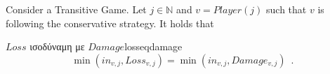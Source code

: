   Consider a Transitive Game. Let $j \in \mathbb{N}$ and $v = Player\left(j\right)$ such that $v$ is following the
  conservative strategy. It holds that
\begin{lemmagr}{$Loss$ ισοδύναμη με $Damage$}{losseqdamage} \ \\
  \begin{equation*}
    \min\left(in_{v, j}, Loss_{v, j}\right) = \min\left(in_{v, j}, Damage_{v, j}\right) \enspace.
  \end{equation*}
\end{lemmagr}
